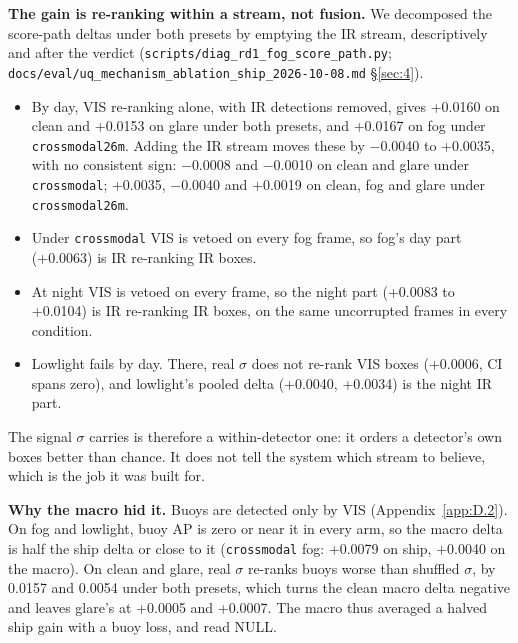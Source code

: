 \documentclass[10pt]{article}
\begin{document}
\textbf{The gain is re-ranking within a stream, not fusion.} We decomposed the score-path deltas under both presets by emptying the IR stream, descriptively and after the verdict (\texttt{scripts/\allowbreak{}diag\_\allowbreak{}rd1\_\allowbreak{}fog\_\allowbreak{}score\_\allowbreak{}path.py}; \texttt{docs/\allowbreak{}eval/\allowbreak{}uq\_\allowbreak{}mechanism\_\allowbreak{}ablation\_\allowbreak{}ship\_\allowbreak{}2026-10-08.md} \S\ref{sec:4}).
\begin{itemize}
\item By day, VIS re-ranking alone, with IR detections removed, gives +0.0160 on clean and +0.0153 on glare under both presets, and +0.0167 on fog under \texttt{crossmodal26m}. Adding the IR stream moves these by $-$0.0040 to +0.0035, with no consistent sign: $-$0.0008 and $-$0.0010 on clean and glare under \texttt{crossmodal}; +0.0035, $-$0.0040 and +0.0019 on clean, fog and glare under \texttt{crossmodal26m}.
\item Under \texttt{crossmodal} VIS is vetoed on every fog frame, so fog's day part (+0.0063) is IR re-ranking IR boxes.
\item At night VIS is vetoed on every frame, so the night part (+0.0083 to +0.0104) is IR re-ranking IR boxes, on the same uncorrupted frames in every condition.
\item Lowlight fails by day. There, real $\sigma$ does not re-rank VIS boxes (+0.0006, CI spans zero), and lowlight's pooled delta (+0.0040, +0.0034) is the night IR part.
\end{itemize}

The signal $\sigma$ carries is therefore a within-detector one: it orders a detector's own boxes better than chance. It does not tell the system which stream to believe, which is the job it was built for.

\textbf{Why the macro hid it.} Buoys are detected only by VIS (Appendix~\ref{app:D.2}). On fog and lowlight, buoy AP is zero or near it in every arm, so the macro delta is half the ship delta or close to it (\texttt{crossmodal} fog: +0.0079 on ship, +0.0040 on the macro). On clean and glare, real $\sigma$ re-ranks buoys worse than shuffled $\sigma$, by 0.0157 and 0.0054 under both presets, which turns the clean macro delta negative and leaves glare's at +0.0005 and +0.0007. The macro thus averaged a halved ship gain with a buoy loss, and read NULL.
\end{document}
